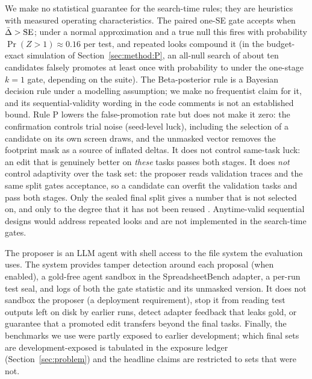 We make no statistical guarantee for the search-time rules; they are heuristics with measured operating characteristics.
The paired one-SE gate accepts when $\bar\Delta>\mathrm{SE}$; under a normal approximation and a true null this fires with
probability $\Pr(Z>1)\approx0.16$ per test, and repeated looks compound it (in the budget-exact simulation of Section~\ref{sec:method:P}, an all-null search of about ten candidates falsely promotes at least once with probability \simKoneFalseB{} to \simKoneFalseA{} under the one-stage $k=1$ gate, depending on the suite).
The Beta-posterior rule is a Bayesian decision rule under a modelling assumption; we make no frequentist claim for it,
and its sequential-validity wording in the code comments is not an established bound.
Rule P lowers the false-promotion rate but does not make it zero: the confirmation controls trial noise (seed-level luck),
including the selection of a candidate on its own screen draws, and the unmasked vector removes the footprint mask as a source of
inflated deltas. It does not control same-task luck: an edit that is genuinely better on \emph{these} tasks passes both stages. It does \emph{not} control adaptivity over the task set: the proposer reads validation traces and the
same split gates acceptance, so a candidate can overfit the validation tasks and pass both stages. Only the sealed final
split gives a number that is not selected on, and only to the degree that it has not been reused
\citep{adaptive-data-analysis-holdout-reuse}. Anytime-valid sequential designs
\citep{confidence-sequences,shawn2026pace} would address repeated looks and are not implemented in the search-time gates.

The proposer is an LLM agent with shell access to the file system the evaluation uses. The system provides tamper detection around each proposal (when enabled), a gold-free agent sandbox in the SpreadsheetBench adapter, a per-run test seal, and logs of both the gate statistic and its unmasked version. It does not sandbox the proposer (a deployment requirement), stop it from reading test outputs left on disk by earlier runs, detect adapter feedback that leaks gold, or guarantee that a promoted edit transfers beyond the final tasks.
Finally, the benchmarks we use were partly exposed to earlier development; which final sets are development-exposed is
tabulated in the exposure ledger (Section~\ref{sec:problem}) and the headline claims are restricted to sets that were not.
